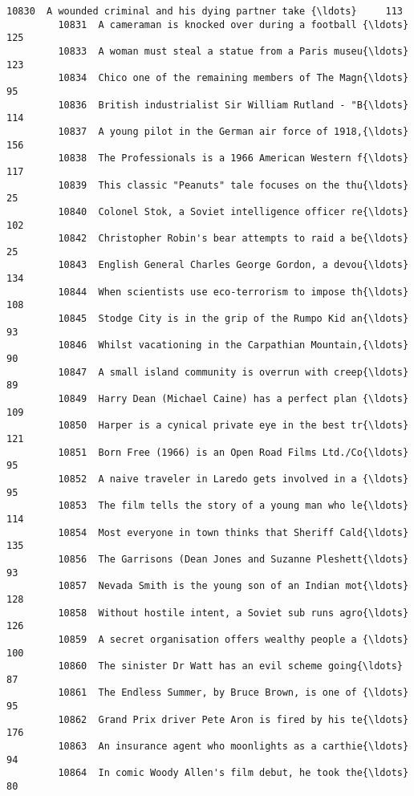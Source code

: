 \documentclass[11pt]{article}
\begin{document}
\begin{Verbatim}[commandchars=\\\{\}]
         10830  A wounded criminal and his dying partner take {\ldots}     113   
         10831  A cameraman is knocked over during a football {\ldots}     125   
         10833  A woman must steal a statue from a Paris museu{\ldots}     123   
         10834  Chico one of the remaining members of The Magn{\ldots}      95   
         10836  British industrialist Sir William Rutland - "B{\ldots}     114   
         10837  A young pilot in the German air force of 1918,{\ldots}     156   
         10838  The Professionals is a 1966 American Western f{\ldots}     117   
         10839  This classic "Peanuts" tale focuses on the thu{\ldots}      25   
         10840  Colonel Stok, a Soviet intelligence officer re{\ldots}     102   
         10842  Christopher Robin's bear attempts to raid a be{\ldots}      25   
         10843  English General Charles George Gordon, a devou{\ldots}     134   
         10844  When scientists use eco-terrorism to impose th{\ldots}     108   
         10845  Stodge City is in the grip of the Rumpo Kid an{\ldots}      93   
         10846  Whilst vacationing in the Carpathian Mountain,{\ldots}      90   
         10847  A small island community is overrun with creep{\ldots}      89   
         10849  Harry Dean (Michael Caine) has a perfect plan {\ldots}     109   
         10850  Harper is a cynical private eye in the best tr{\ldots}     121   
         10851  Born Free (1966) is an Open Road Films Ltd./Co{\ldots}      95   
         10852  A naive traveler in Laredo gets involved in a {\ldots}      95   
         10853  The film tells the story of a young man who le{\ldots}     114   
         10854  Most everyone in town thinks that Sheriff Cald{\ldots}     135   
         10856  The Garrisons (Dean Jones and Suzanne Pleshett{\ldots}      93   
         10857  Nevada Smith is the young son of an Indian mot{\ldots}     128   
         10858  Without hostile intent, a Soviet sub runs agro{\ldots}     126   
         10859  A secret organisation offers wealthy people a {\ldots}     100   
         10860  The sinister Dr Watt has an evil scheme going{\ldots}      87   
         10861  The Endless Summer, by Bruce Brown, is one of {\ldots}      95   
         10862  Grand Prix driver Pete Aron is fired by his te{\ldots}     176   
         10863  An insurance agent who moonlights as a carthie{\ldots}      94   
         10864  In comic Woody Allen's film debut, he took the{\ldots}      80   
         

\end{Verbatim}
\end{document}
